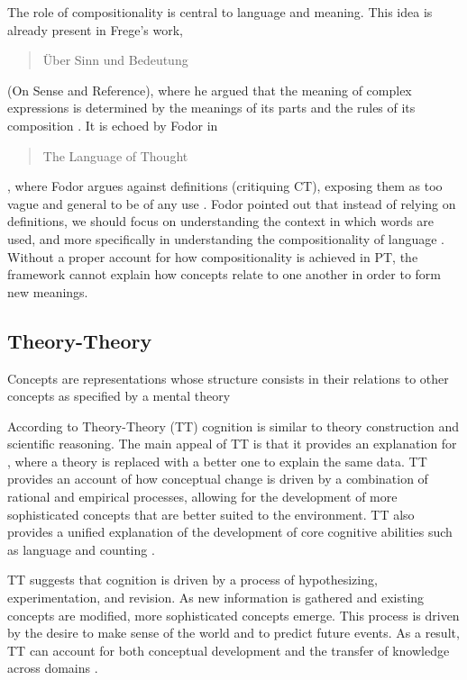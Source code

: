The role of compositionality is central to language and meaning. This idea is already present in Frege's work, \blockquote{Über Sinn und Bedeutung} (On Sense and Reference), where he argued that the meaning of complex expressions is determined by the meanings of its parts and the rules of its composition \citep{Frege1892}. It is echoed by Fodor in \blockquote{The Language of Thought}, where Fodor argues against definitions (critiquing CT), exposing them as too vague and general to be of any use \citep{Fodor1975}. Fodor pointed out that instead of relying on definitions, we should focus on understanding the context in which words are used, and more specifically in understanding the compositionality of language \citep{Fodor2008}. Without a proper account for how compositionality is achieved in PT, the framework cannot explain how concepts relate to one another in order to form new meanings. 

\subsection{Theory-Theory}
\begin{mycolorbox}
	Concepts are representations whose structure consists in their relations to other concepts as specified by a mental theory
\end{mycolorbox}

According to Theory-Theory (TT) cognition is similar to theory construction and scientific reasoning. The main appeal of TT is that it provides an explanation for , where a theory is replaced with a better one to explain the same data. TT provides an account of how conceptual change is driven by a combination of rational and empirical processes, allowing for the development of more sophisticated concepts that are better suited to the environment. TT also provides a unified explanation of the development of core cognitive abilities such as language and counting \citep{Carey1991,Carey2009}.

TT suggests that cognition is driven by a process of hypothesizing, experimentation, and revision. As new information is gathered and existing concepts are modified, more sophisticated concepts emerge. This process is driven by the desire to make sense of the world and to predict future events. As a result, TT can account for both conceptual development and the transfer of knowledge across domains \citep{Murphy1985}. 

